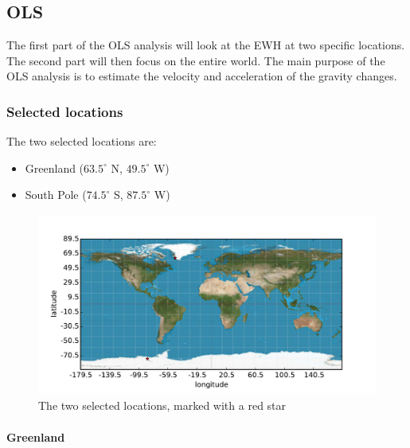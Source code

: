 \subsection{OLS}

The first part of the OLS analysis will look at the EWH at two specific locations. The second part will then focus on the entire world. The main purpose of the OLS analysis is to estimate the velocity and acceleration of the gravity changes.

\subsubsection{Selected locations}

The two selected locations are:
\begin{itemize}
\item Greenland ($63.5^\circ$ N, $49.5^\circ$ W)
\item South Pole ($74.5^\circ$ S, $87.5^\circ$ W)
\end{itemize}
\begin{figure}[H]
	\centering
	\includegraphics[height=6cm]{figures/ols-selected-map}
	\caption{The two selected locations, marked with a red star}
\end{figure}

\paragraph{Greenland}

